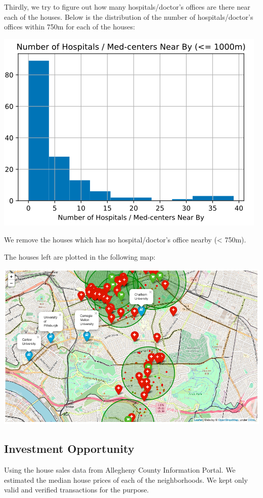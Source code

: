 \documentclass[11pt,notitlepage]{article}
\begin{document}
Thirdly, we try to figure out how many hospitals/doctor's offices are there near
each of the houses.
Below is the distribution of the number of hospitals/doctor's offices
within 750m for each of the houses:
\begin{center}
    \includegraphics[scale=0.4]{med.png}
\end{center}
We remove the houses which has no hospital/doctor's office nearby (< 750m).

The houses left are plotted in the following map:
\begin{center}
    \includegraphics[scale=0.4]{restrict.png}
\end{center}

\subsection{Investment Opportunity}
Using the house sales data from Allegheny County Information Portal.
We estimated the median house prices of each of the neighborhoods.
We kept only valid and verified transactions for the purpose.
\end{document}
